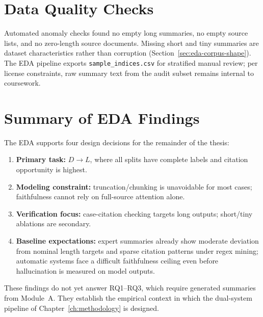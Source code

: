 \section{Data Quality Checks}
\label{sec:eda-quality}

Automated anomaly checks found no empty long summaries, no empty source lists, and no zero-length source documents. Missing short and tiny summaries are dataset characteristics rather than corruption (Section~\ref{sec:eda-corpus-shape}). The EDA pipeline exports \texttt{sample\_indices.csv} for stratified manual review; per license constraints, raw summary text from the audit subset remains internal to coursework.

\section{Summary of EDA Findings}
\label{sec:eda-summary}

The EDA supports four design decisions for the remainder of the thesis:
\begin{enumerate}
  \item \textbf{Primary task:} $D\rightarrow L$, where all splits have complete labels and citation opportunity is highest.
  \item \textbf{Modeling constraint:} truncation/chunking is unavoidable for most cases; faithfulness cannot rely on full-source attention alone.
  \item \textbf{Verification focus:} case-citation checking targets long outputs; short/tiny ablations are secondary.
  \item \textbf{Baseline expectations:} expert summaries already show moderate deviation from nominal length targets and sparse citation patterns under regex mining; automatic systems face a difficult faithfulness ceiling even before hallucination is measured on model outputs.
\end{enumerate}

These findings do not yet answer RQ1--RQ3, which require generated summaries from Module~A. They establish the empirical context in which the dual-system pipeline of Chapter~\ref{ch:methodology} is designed.
